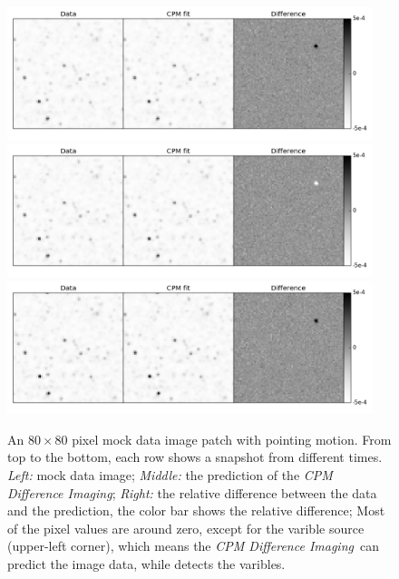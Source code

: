 \documentclass[12pt, preprint]{aastex}
\newcommand{\project}[1]{\textsl{#1}}
\newcommand{\cpmdiff}{\project{CPM Difference Imaging}}
\begin{document}
\begin{figure}[p]
\begin{center}
\includegraphics[width=0.95\textwidth]{f1a}
\includegraphics[width=0.95\textwidth]{f1b}
\includegraphics[width=0.95\textwidth]{f1c}
\end{center}
\caption{
  \label{space}
  An $80\times 80$ pixel mock data image patch with pointing motion. 
  From top to the bottom,  each row shows a snapshot from different times.
  \emph{Left:} mock data image;
  \emph{Middle:} the prediction of the \cpmdiff;
  \emph{Right:} the relative difference between the data and the prediction, the color bar shows the relative difference;
  Most of the pixel values are around zero, except for the varible source (upper-left corner), which means the \cpmdiff\ can predict the image data, while detects the varibles.
}
\end{figure}
\end{document}
